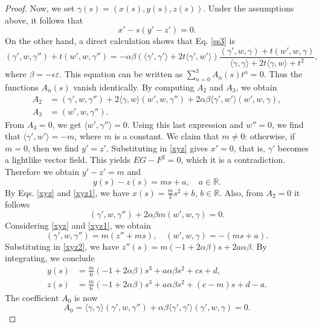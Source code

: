 \documentclass[a4paper,12pt]{amsart}
\theoremstyle{definition}
\def\r{\mathbb R}
\begin{document}
\begin{proof}
Now, we set $\gamma(s) = (x(s), y(s), z(s))$. Under the assumptions above, it follows that
\begin{equation}
x'-s(y'-z')=0. \label{xyz}
\end{equation}
On the other hand, a direct calculation shows that Eq.  \eqref{ss3} is 
$$
(\gamma',w,\gamma'')+t(w',w,\gamma'')=-\alpha\beta(\langle \gamma',\gamma'\rangle+2t\langle \gamma',w'\rangle)\frac{(\gamma',w,\gamma)+t(w',w,\gamma)}{\langle \gamma,\gamma\rangle+2t\langle \gamma,w\rangle+t^2},
$$
where $\beta=-\epsilon\varepsilon$. This equation can be written as $\sum_{n=0}^3 A_n(s) t^n = 0$. Thus  the functions $A_n(s)$ vanish identically. By computing $A_2$ and $A_3$, we obtain
$$
\begin{aligned}
A_2&=(\gamma',w,\gamma'')+2\langle\gamma, w \rangle(w',w,\gamma'')+2\alpha \beta \langle\gamma', w' \rangle (w',w,\gamma), \\
A_3&=(w',w,\gamma'').
\end{aligned}
$$
From $A_3=0$, we get $\langle w',\gamma'' \rangle =0$. Using this last expression and $w'' = 0$, we find that $\langle \gamma', w' \rangle = -m$, where $m$ is a constant. We claim that $m \neq 0$: otherwise, if  $m=0$, then we find $y'=z'$. Substituting in \eqref{xyz} gives $x'=0$, that is, $\gamma'$ becomes a lightlike vector field. This yields $EG-F^2=0$, which it is a contradiction. Therefore we obtain $y'-z'=m$ and
\begin{equation}
 y(s)-z(s)=ms+a, \quad a\in \r. \label{xyz1}
\end{equation}
By Eqs. \eqref{xyz} and \eqref{xyz1}, we have $x(s)=\frac{m}{2}s^2+b$, $b\in \r$.
Also, from $A_2=0$ it follows
\begin{equation}
(\gamma',w,\gamma'')+2\alpha \beta m (w',w,\gamma)=0. \label{xyz2}
\end{equation}
Considering   \eqref{xyz} and \eqref{xyz1}, we obtain 
$$
(\gamma',w,\gamma'')=m(z''+ms), \quad (w',w,\gamma)=-(ms+a).
$$
Substituting in \eqref{xyz2}, we have $z''(s)=m(-1+2\alpha\beta)s+2a\alpha\beta$. By integrating, we conclude
\begin{equation*}
\begin{split}
y(s)&=\frac{m}{6}(-1+2\alpha\beta)s^3+a\alpha \beta s^2+cs+d, \\
 z(s)&=\frac{m}{6}(-1+2\alpha\beta)s^3+a\alpha\beta s^2+(c-m)s+d-a.
\end{split}
\end{equation*}
The coefficient $A_0$ is now
$$
A_0=\langle \gamma, \gamma \rangle (\gamma',w,\gamma'')+\alpha\beta \langle \gamma', \gamma' \rangle (\gamma',w,\gamma)=0.
$$
\end{proof}
\end{document}
